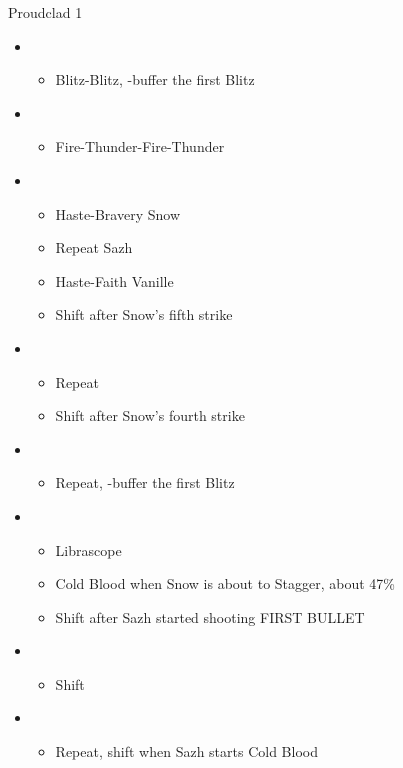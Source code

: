 \begin{multicols}{2}
\begin{battle}{Proudclad 1}
\begin{itemize}
    \item \second
    \begin{itemize}
        \item Blitz-Blitz, \rav-buffer the first Blitz
    \end{itemize}
    \item \sixth
    \begin{itemize}
        \item Fire-Thunder-Fire-Thunder
    \end{itemize}
    \item \fourth
    \begin{itemize}
        \item Haste-Bravery Snow
        \item Repeat Sazh
        \item Haste-Faith Vanille
        \item Shift after Snow's fifth strike
    \end{itemize}
    \item \sixth
    \begin{itemize}
        \item Repeat
        \item Shift after Snow's fourth strike
    \end{itemize}
    \item \first
    \begin{itemize}
        \item Repeat, \rav-buffer the first Blitz
    \end{itemize}
    \item \fifth
    \begin{itemize}
        \item Librascope
        \item Cold Blood when Snow is about to Stagger, about 47\%
        \item Shift after Sazh started shooting FIRST BULLET
    \end{itemize}
    \item \sixth
    \begin{itemize}
        \item Shift
    \end{itemize}
    \item \fifth
    \begin{itemize}
        \item Repeat, shift when Sazh starts Cold Blood

\end{itemize}
\end{itemize}
\end{battle}
\end{multicols}
